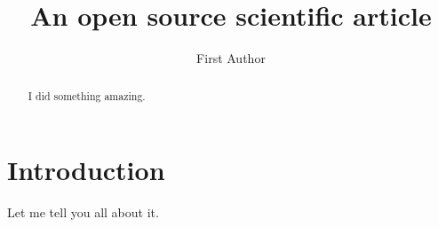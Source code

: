 \documentclass[twocolumn]{aastex631}
\begin{document}
\title{An open source scientific article}

\author{First Author}

\begin{abstract}
    I did something amazing.
\end{abstract}

\section{Introduction}
Let me tell you all about it.
\end{document}
